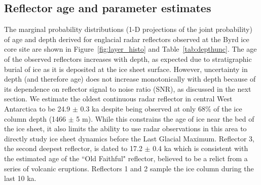 
\subsection{Reflector age and parameter estimates}
The marginal probability distributions (1-D projections of the joint probability) of age and depth derived for englacial radar reflectors observed at the Byrd ice core site are shown in Figure~\ref{fig:layer_histo} and Table~\ref{tab:depthunc}. The age of the observed reflectors increases with depth, as expected due to stratigraphic burial of ice as it is deposited at the ice sheet surface. However, uncertainty in depth (and therefore age) does not increase monotonically with depth because of its dependence on reflector signal to noise ratio (SNR), as discussed in the next section. %
We estimate the oldest continuous radar reflector in central West Antarctica to be 24.9 $\pm$ 0.3 ka despite being observed at only 68\% of the ice column depth (1466 $\pm$ 5 m). While this constrains the age of ice near the bed of the ice sheet, it also limits the ability to use radar observations in this area to directly study ice sheet dynamics before the Last Glacial Maximum. Reflector 3, the second deepest reflector, is dated to 17.2 $\pm$ 0.4 ka which is consistent with the estimated age of the ``Old Faithful" reflector, believed to be a relict from a series of volcanic eruptions. Reflectors 1 and 2 sample the ice column during the last 10 ka.%

